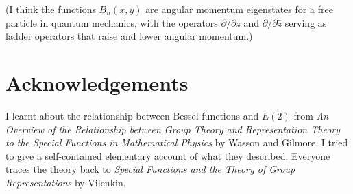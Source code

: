 \documentclass{article}
\begin{document}
(I think the functions $B_n(x,y)$ are angular momentum eigenstates for a free particle in quantum mechanics, with the operators $\partial/\partial z$ and $\partial/\partial\bar{z}$ serving as ladder operators that raise and lower angular momentum.)

\section{Acknowledgements}
I learnt about the relationship between Bessel functions and $E(2)$ from \textit{An Overview of the Relationship between Group Theory and Representation Theory to the Special Functions in Mathematical Physics} by Wasson and Gilmore.
I tried to give a self-contained elementary account of what they described.
Everyone traces the theory back to \textit{Special Functions and the Theory of Group Representations} by Vilenkin.
\end{document}
